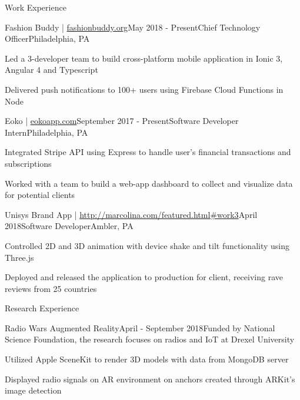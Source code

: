 \documentclass{resume} %
\begin{document}
\begin{rSection}{Work Experience}
\begin{rSubsection}{Fashion Buddy | \url{fashionbuddy.org}}{May 2018 - Present}{Chief Technology Officer}{Philadelphia, PA}
\item Led a 3-developer team to build cross-platform mobile application in Ionic 3, Angular 4 and Typescript
\item Delivered push notifications to 100+ users using Firebase Cloud Functions in Node

\end{rSubsection}
\begin{rSubsection}{Eoko | \url{eokoapp.com}}{September 2017 - Present}{Software Developer Intern}{Philadelphia, PA}
\item Integrated Stripe API using Express to handle user's financial transactions and subscriptions 
\item Worked with a team to build a web-app dashboard to collect and visualize data for potential clients

\end{rSubsection}

\begin{rSubsection}{Unisys Brand App | \url{http://marcolina.com/featured.html#work3}}{April 2018}{Software Developer}{Ambler, PA}
\item Controlled 2D and 3D animation with device shake and tilt functionality using Three.js
\item Deployed and released the application to production for client, receiving rave reviews from 25 countries
\end{rSubsection}


\end{rSection}



\begin{rSection}{Research Experience}
\begin{rSubsection}{Radio Wars Augmented Reality}{April - September 2018}{Funded by National Science Foundation, the research focuses on radios and IoT at Drexel University}{}
\item Utilized Apple SceneKit to render 3D models with data from MongoDB server
\item Displayed radio signals on AR environment on anchors created through ARKit's image detection
\end{rSubsection}


\end{rSection}
\end{document}
